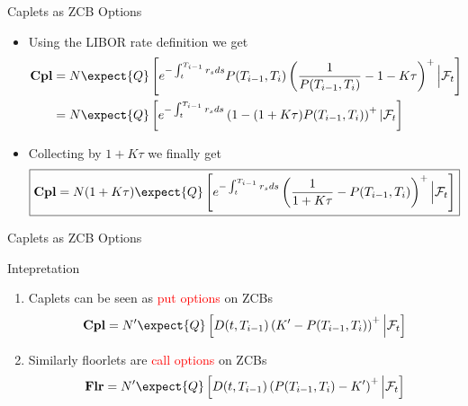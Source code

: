 \documentclass{beamer}
\begin{document}
\begin{frame}{Caplets as ZCB Options}
	\begin{itemize}
		\item<1-> Using the LIBOR rate definition we get
		\begin{equation*}
			\begin{aligned}
				\textbf{Cpl} &=N\expect{Q}\left[e^{-\int_t^{T_{i-1}}r_s ds}P(T_{i-1},T_i)\left(\frac{1}{P(T_{i-1},T_i)}-1-K\tau\right)^+ \Big\rvert \mathcal{F}_t\right] \\
				& = N\expect{Q}\left[e^{-\int_t^{T_{i-1}}r_s ds}\left(1-(1+K\tau)P(T_{i-1},T_i)\right)^+ | \mathcal{F}_t\right]
			\end{aligned}
		\end{equation*}
		\item<2-> Collecting by $1+K\tau$ we finally get
		\begin{equation}
			\boxed{\textbf{Cpl}=N(1+K\tau)\expect{Q}\left[e^{-\int_t^{T_{i-1}}r_s ds}\left(\frac{1}{1+K\tau}-P(T_{i-1},T_i)\right)^+ \Big\rvert \mathcal{F}_t\right]}
		\end{equation}
	\end{itemize}
\end{frame}

\begin{frame}{Caplets as ZCB Options}
	\begin{block}{Intepretation}
		\begin{enumerate}
		\item Caplets can be seen as \textcolor{red}{put options} on ZCBs
\begin{equation*}
\textbf{Cpl}=N'\expect{Q}\left[D(t,T_{i-1})\left(K'-P(T_{i-1},T_i)\right)^+ \Big\rvert \mathcal{F}_t\right]
\end{equation*}
		\item Similarly floorlets are \textcolor{red}{call options} on ZCBs
\begin{equation}
\textbf{Flr}=N'\expect{Q}\left[D(t, T_{i-1})\left(P(T_{i-1},T_i)-K'\right)^+ \Big\rvert \mathcal{F}_t\right]
\end{equation}
		\end{enumerate}
	\end{block}
\end{frame}
\end{document}
